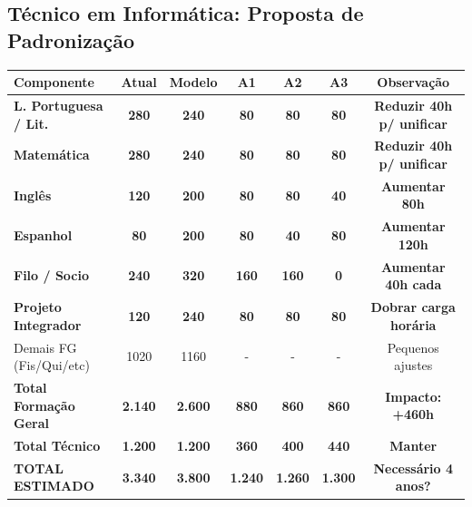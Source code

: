 \documentclass[a4paper,12pt]{article}
\begin{document}
\subsection{Técnico em Informática: Proposta de Padronização}
\begin{center}
\scriptsize
\begin{tabular}{lcccccc}
\toprule
\rowcolor{gray!20} \textbf{Componente} & \textbf{Atual} & \textbf{Modelo} & \textbf{A1} & \textbf{A2} & \textbf{A3} & \textbf{Observação} \\ \midrule
\rowcolor{yellow!60!orange!30} \textbf{L. Portuguesa / Lit.} & \textbf{280} & \textbf{240} & \textbf{80} & \textbf{80} & \textbf{80} & \textbf{Reduzir 40h p/ unificar} \\
\rowcolor{yellow!60!orange!30} \textbf{Matemática} & \textbf{280} & \textbf{240} & \textbf{80} & \textbf{80} & \textbf{80} & \textbf{Reduzir 40h p/ unificar} \\
\rowcolor{yellow!60!orange!30} \textbf{Inglês} & \textbf{120} & \textbf{200} & \textbf{80} & \textbf{80} & \textbf{40} & \textbf{Aumentar 80h} \\
\rowcolor{yellow!60!orange!30} \textbf{Espanhol} & \textbf{80} & \textbf{200} & \textbf{80} & \textbf{40} & \textbf{80} & \textbf{Aumentar 120h} \\
\rowcolor{yellow!60!orange!30} \textbf{Filo / Socio} & \textbf{240} & \textbf{320} & \textbf{160} & \textbf{160} & \textbf{0} & \textbf{Aumentar 40h cada} \\
\rowcolor{yellow!60!orange!30} \textbf{Projeto Integrador} & \textbf{120} & \textbf{240} & \textbf{80} & \textbf{80} & \textbf{80} & \textbf{Dobrar carga horária} \\
Demais FG (Fis/Qui/etc) & 1020 & 1160 & - & - & - & Pequenos ajustes \\ \midrule
\rowcolor{yellow!10} \textbf{Total Formação Geral} & \textbf{2.140} & \textbf{2.600} & \textbf{880} & \textbf{860} & \textbf{860} & \textbf{Impacto: +460h} \\
\rowcolor{yellow!10} \textbf{Total Técnico} & \textbf{1.200} & \textbf{1.200} & \textbf{360} & \textbf{400} & \textbf{440} & \textbf{Manter} \\ \midrule
\rowcolor{red!10} \textbf{TOTAL ESTIMADO} & \textbf{3.340} & \textbf{3.800} & \textbf{1.240} & \textbf{1.260} & \textbf{1.300} & \textbf{Necessário 4 anos?} \\ \bottomrule
\end{tabular}
\end{center}
\end{document}
